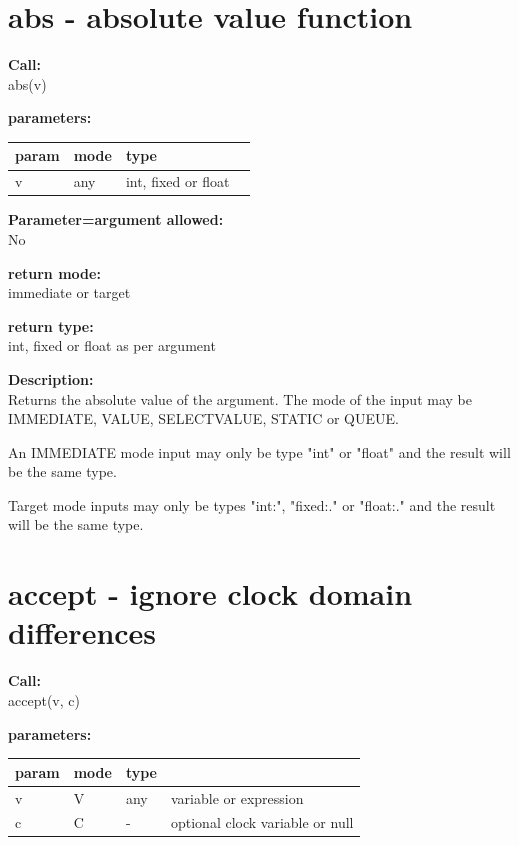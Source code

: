     \section{abs - absolute value function}\label{sec:ifabs}
        
        
        {\bf Call:} \\
        abs(v)
        
        {\bf parameters:} \\
        \begin{tabular}{| l | l | l | l |}
        \hline
        param  & mode & type & \\
        \hline \hline
        v & any & int, fixed or float & \\ \hline
        \end{tabular}
        
        {\bf Parameter=argument allowed:} \\
        No
        
        {\bf return mode:} \\
        immediate or target

        {\bf return type:} \\
        int, fixed or float as per argument
        
        {\bf Description:} \\
        Returns the absolute value of the argument. The mode of the input
        may be IMMEDIATE, VALUE, SELECTVALUE, STATIC or QUEUE.
        
        An IMMEDIATE mode input may only be type "int" or "float"
        and the result will be the same type.
        
        Target mode inputs may only be types "int:", "fixed:." or "float:."
        and the result will be the same type.


    \section{accept - ignore clock domain differences}\label{sec:ifaccept}
        
        {\bf Call:} \\
        accept(v, c)
        
        {\bf parameters:} \\
        \begin{tabular}{| l | l | l | l |}
        \hline
        param  & mode & type & \\
        \hline \hline
        v & V & any & variable or expression \\ \hline
        c & C &  -  & optional clock variable or null \\ \hline
        \end{tabular}
        
